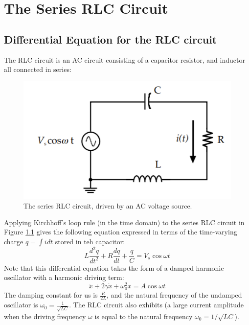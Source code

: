 \chapter{The Series RLC Circuit}

\section{Differential Equation for the RLC circuit}

The RLC circuit is an AC circuit consisting of a capacitor resistor, and inductor all connected in series:

\begin{figure}[H]
    \centering
    \includegraphics[scale = 0.8]{Images/RLCCircuit.PNG}
    \caption{The series RLC circuit, driven by an AC voltage source.}
    \label{fig:RLCCircuit}
\end{figure}

Applying Kirchhoff's loop rule (in the time domain) to the series RLC circuit in Figure \ref{fig:RLCCircuit} gives the following equation expressed in terms of the time-varying charge $q = \int idt$ stored in teh capacitor: \begin{equation*}
    L\frac{d^2q}{dt^2} + R\frac{dq}{dt} + \frac{q}{C} = V_s\cos\omega t
\end{equation*}
Note that this differential equation takes the form of a damped harmonic oscillator with a harmonic driving term: \begin{equation*}
    \ddot{x} + 2\gamma\dot{x} + \omega_0^2x = A\cos\omega t
\end{equation*}
The damping constant for us is $\frac{R}{2L}$, and the natural frequency of the undamped oscillator is $\omega_0 = \frac{1}{\sqrt{LC}}$. The RLC circuit also exhibits  (a large current amplitude when the driving frequency $\omega$ is equal to the natural frequency $\omega_0 = 1/\sqrt{LC}$).

